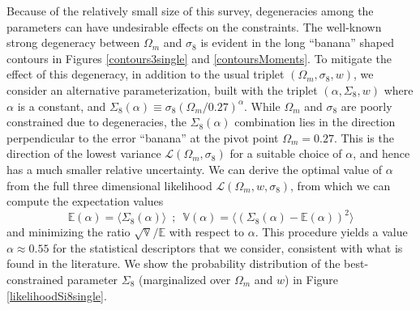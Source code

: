 \documentclass[reprint,aps,prd,superscriptaddress,showkeys,showpacs]{revtex4-1}
\begin{document}
Because of the relatively small size of this survey, degeneracies
among the parameters can have undesirable effects on the constraints.
The well-known strong degeneracy between $\Omega_m$ and $\sigma_8$ is
evident in the long ``banana'' shaped contours in Figures
\ref{contours3single} and \ref{contoursMoments}.  To mitigate the
effect of this degeneracy, in addition to the usual triplet
$(\Omega_m,\sigma_8,w)$, we consider an alternative parameterization,
built with the triplet $(\alpha,\Sigma_8,w)$ where $\alpha$ is a
constant, and
$\Sigma_8(\alpha)\equiv\sigma_8(\Omega_m/0.27)^\alpha$. While
$\Omega_m$ and $\sigma_8$ are poorly constrained due to degeneracies,
the $\Sigma_8(\alpha)$ combination lies in the direction perpendicular
to the error ``banana'' at the pivot point $\Omega_m=0.27$.  
This is the direction of the lowest variance
$\mathcal{L}(\Omega_m,\sigma_8)$ for a suitable choice of $\alpha$,
and hence has a much smaller relative uncertainty. We can derive the
optimal value of $\alpha$ from the full three dimensional likelihood
$\mathcal{L}(\Omega_m,w,\sigma_8)$, from which we can compute the
expectation values
\begin{equation}
\mathds{E}(\alpha) = \langle\Sigma_8(\alpha)\rangle \,\,\, ; \,\,\, \mathds{V}(\alpha) = \langle(\Sigma_8(\alpha)-\mathds{E}(\alpha))^2\rangle
\end{equation}
%
and minimizing the ratio $\sqrt{\mathds{V}}/\mathds{E}$ with respect
to $\alpha$. 
This procedure yields a value $\alpha\approx0.55$ for the
statistical descriptors that we consider, 
consistent with what is found in the literature.
We show the probability distribution of the best-constrained parameter
$\Sigma_8$ (marginalized over $\Omega_m$ and $w$) in Figure
\ref{likelihoodSi8single}. 
\end{document}
